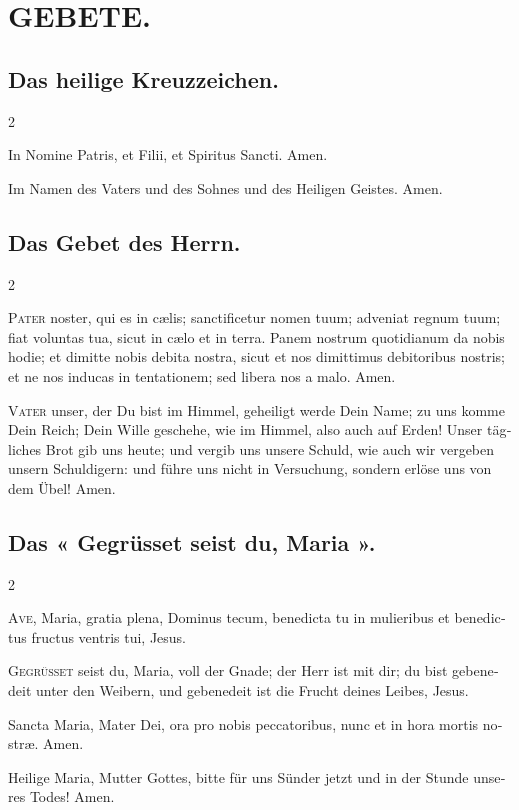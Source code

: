 \documentclass[14pt,a4paper]{extarticle}
\newcommand\chunks[2]{%
\begin{leftcolumn*}\begin{otherlanguage}{latin}%
\noindent\kern\parindent\ignorespaces#1%
\end{otherlanguage}\end{leftcolumn*}%
\begin{rightcolumn}\begin{otherlanguage}{german}%
\noindent\kern\parindent\ignorespaces#2%
\end{otherlanguage}\end{rightcolumn}%
}
\begin{document}
\thispagestyle{empty}

\section*{GEBETE.}

\subsection*{Das heilige Kreuzzeichen.}
\begin{paracol}{2}
\chunks{In Nomine Patris, et Filii, et Spiritus Sancti. Amen.}
       {Im Namen des Vaters und des Sohnes und des Heiligen Geistes. Amen.}
\end{paracol}

\subsection*{Das Gebet des Herrn.}
\begin{paracol}{2}
\chunks{\textsc{Pater} noster, qui es in cælis; sanctificetur nomen tuum; adveniat regnum tuum; fiat voluntas tua, sicut in cælo et in terra. Panem nostrum quotidianum da nobis hodie; et dimitte nobis debita nostra, sicut et nos dimittimus debitoribus nostris; et ne nos inducas in tentationem; sed libera nos a malo. Amen.}
       {\textsc{Vater} unser, der Du bist im Himmel, geheiligt werde Dein Name; zu uns komme Dein Reich; Dein Wille geschehe, wie im Himmel, also auch auf Erden! Unser tägliches Brot gib uns heute; und vergib uns unsere Schuld, wie auch wir vergeben unsern Schuldigern: und führe uns nicht in Versuchung, sondern erlöse uns von dem Übel! Amen.}
\end{paracol}

\subsection*{Das « Gegrüsset seist du, Maria ».}
\begin{paracol}{2}
\chunks{\textsc{Ave}, Maria, gratia plena, Dominus tecum, benedicta tu in mulieribus et benedictus fructus ventris tui, Jesus.}
       {\textsc{Gegrüsset} seist du, Maria, voll der Gnade; der Herr ist mit dir; du bist gebenedeit unter den Weibern, und gebenedeit ist die Frucht deines Leibes, Jesus.}
\chunks{Sancta Maria, Mater Dei, ora pro nobis peccatoribus, nunc et in hora mortis nostræ. Amen.}
       {Heilige Maria, Mutter Gottes, bitte für uns Sünder jetzt und in der Stunde unseres Todes! Amen.}
\end{paracol}
\end{document}
